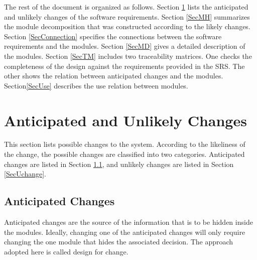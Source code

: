 \documentclass[12pt, titlepage]{article}
\begin{document}
The rest of the document is organized as follows. Section
\ref{SecChange} lists the anticipated and unlikely changes of the software
requirements. Section \ref{SecMH} summarizes the module decomposition that
was constructed according to the likely changes. Section \ref{SecConnection}
specifies the connections between the software requirements and the
modules. Section \ref{SecMD} gives a detailed description of the
modules. Section \ref{SecTM} includes two traceability matrices. One checks
the completeness of the design against the requirements provided in the SRS.
The other shows the relation between anticipated changes and the modules.
Section\ref{SecUse} describes the use relation between modules.

\section{Anticipated and Unlikely Changes} \label{SecChange}

This section lists possible changes to the system. According to the likeliness
of the change, the possible changes are classified into two
categories. Anticipated changes are listed in Section \ref{SecAchange}, and
unlikely changes are listed in Section \ref{SecUchange}.

\subsection{Anticipated Changes} \label{SecAchange}

Anticipated changes are the source of the information that is to be hidden
inside the modules. Ideally, changing one of the anticipated changes will only
require changing the one module that hides the associated decision. The
approach adopted here is called design for
change.
\end{document}
